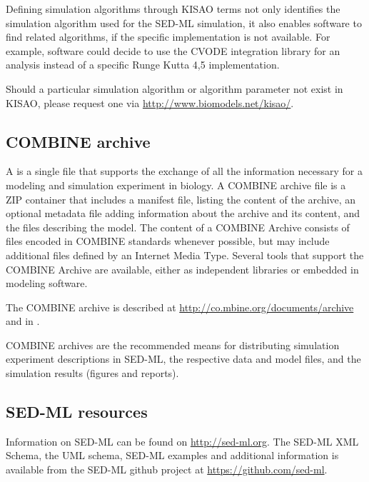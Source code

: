 Defining simulation algorithms through KISAO terms not only identifies the simulation algorithm used for the SED-ML simulation, it also enables software to find related algorithms, if the specific implementation is not available. For example, software could decide to use the CVODE integration library for an analysis instead of a specific Runge Kutta 4,5 implementation. 

Should a particular simulation algorithm or algorithm parameter not exist in KISAO, please 
request one via \url{http://www.biomodels.net/kisao/}.

\subsection{COMBINE archive}
\label{sec:archive}

A  \citep{Bergmann2014} is a single file that supports the exchange of all the information necessary for a modeling and simulation experiment in biology. A COMBINE archive file is a ZIP container that includes a manifest file, listing the content of the archive, an optional metadata file adding information about the archive and its content, and the files describing the model. The content of a COMBINE Archive consists of files encoded in COMBINE standards whenever possible, but may include additional files defined by an Internet Media Type. Several tools that support the COMBINE Archive are available, either as independent libraries or embedded in modeling software.

The COMBINE archive is described at \url{http://co.mbine.org/documents/archive} and 
in \citep{Bergmann2014}.

COMBINE archives are the recommended means for distributing simulation experiment descriptions in SED-ML, the respective data and model files, and the simulation results (figures and reports).

\subsection{SED-ML resources}
\label{sec:resources}

Information on SED-ML can be found on \url{http://sed-ml.org}. The SED-ML XML Schema, the UML schema, SED-ML examples and additional information is available from the SED-ML github project at \url{https://github.com/sed-ml}.
